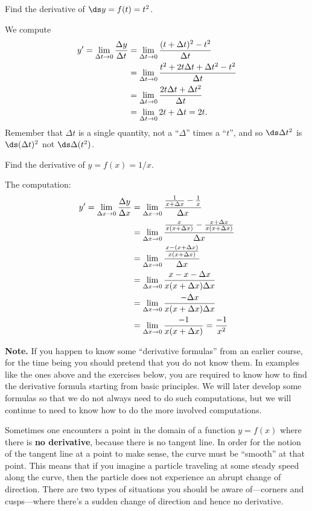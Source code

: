 \begin{example}
Find the derivative of $\ds y=f(t)=t^2$.

We compute 
\begin{align*}
y' = \lim_{\Delta t\to0}{\Delta y\over\Delta t}&=
\lim_{\Delta t\to0}{(t+\Delta t)^2-t^2\over\Delta t} \\
&=\lim_{\Delta t\to0}{t^2+2t\Delta t+\Delta t^2-t^2\over\Delta t} \\
&=\lim_{\Delta t\to0}{2t\Delta t+\Delta t^2\over\Delta t} \\
&=\lim_{\Delta t\to0} 2t+\Delta t=2t.
\end{align*}
Remember that $\Delta t$ is a single quantity, not a ``$\Delta$''
times a ``$t$'', and so $\ds \Delta t^2$ is $\ds (\Delta t)^2$ not 
$\ds \Delta (t^2)$.
\end{example}

\begin{example}
Find the derivative of $y=f(x)=1/x$.

The computation:
\begin{align*}
y' = \lim_{\Delta x\to0}{\Delta y\over\Delta x}&=
\lim_{\Delta x\to0}{ {1\over x+\Delta x} - {1\over x}\over \Delta
  x} \\
&=\lim_{\Delta x\to0}{ {x\over x(x+\Delta x)} - 
{x+\Delta x\over x(x+\Delta x)}\over \Delta x} \\
&=\lim_{\Delta x\to0}{ {x-(x+\Delta x)\over x(x+\Delta x)}\over \Delta x} \\
&=\lim_{\Delta x\to0} {x-x-\Delta x\over x(x+\Delta x)\Delta x} \\
&=\lim_{\Delta x\to0} {-\Delta x\over x(x+\Delta x)\Delta x} \\
&=\lim_{\Delta x\to0} {-1\over x(x+\Delta x)}={-1\over x^2} \\
\end{align*}
\vskip-10pt
\end{example}

{\bf Note.}  If you happen to know some ``derivative formulas'' from
an earlier course, for the time being you should pretend that you do
not know them.
In examples like the ones above and the exercises below, you are required
to know how to find the derivative formula starting from basic principles.
We will later develop some formulas so that we do not always need to
do such computations, but we will continue to need to know how to do
the more involved computations.


Sometimes one encounters a point in the domain of a function $y=f(x)$ where
there is {\bf no derivative}, because there is no tangent line.  In order
for the notion of the tangent line at a point to make sense, the curve must
be ``smooth'' at that point.  This means that if you imagine a particle
traveling at some steady speed along the curve, then the particle does not
experience an abrupt change of direction.  There are two types of
situations you should be aware of---corners and cusps---where there's a
sudden change of direction and hence no derivative.


